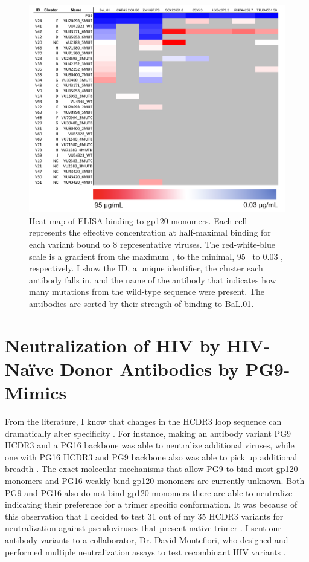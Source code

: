 \begin{figure}[!ht]
   \centering
   \includegraphics[width=.99\linewidth]{images/chapter3/figure3_17.pdf} %
   \caption[Heat-Map of ELISA Binding to Gp120 Monomers]{Heat-map of ELISA binding to gp120 monomers. Each cell represents the effective concentration at half-maximal binding for each variant bound to 8 representative viruses. The red-white-blue scale is a gradient from the maximum \ec, to the minimal, 95 \mcml~to 0.03 \mcml, respectively. I show the ID, a unique identifier, the cluster each antibody falls in, and the name of the antibody that indicates how many mutations from the wild-type sequence were present. The antibodies are sorted by their strength of binding to BaL.01.}
   \label{fig:figure3_17}
\end{figure}

\section{Neutralization of HIV by HIV-Na\"{i}ve Donor Antibodies by PG9-Mimics}
From the literature, I know that changes in the HCDR3 loop sequence can dramatically alter specificity \citep{Pancera:2010hh,Pejchal:2010fp,Pancera:2013ev}. For instance, making an antibody variant PG9 HCDR3 and a PG16 backbone was able to neutralize additional viruses, while one with PG16 HCDR3 and PG9 backbone also was able to pick up additional breadth \citep{Pejchal:2010fp}.
The exact molecular mechanisms that allow PG9 to bind most gp120 monomers and PG16 weakly bind gp120 monomers are currently unknown\citep{McLellan:2011dg}. Both PG9 and PG16 also do not bind gp120 monomers there are able to neutralize indicating their preference for a trimer specific conformation. It was because of this observation that I decided to test 31 out of my 35 HCDR3 variants for neutralization against pseudoviruses that present native trimer \citep{Montefiori:2005jt}. I sent our antibody variants to a collaborator, Dr. David Montefiori, who designed and performed multiple neutralization assays to test recombinant HIV variants \citep{DeCamp:2014jd}.

